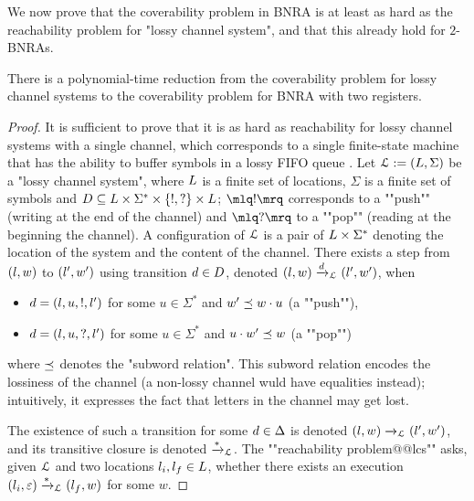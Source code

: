 We now prove that the coverability problem in BNRA is at least as hard as the reachability problem for "lossy channel system", and that this already hold for $2$-BNRAs.  
\begin{proposition}
	\label{prop:reduction-LCS}
	There is a polynomial-time reduction from the coverability problem for lossy channel systems to the coverability problem for BNRA with two registers.
\end{proposition}

\ifproofs
\begin{proof}
It is sufficient to prove that it is as hard as reachability for lossy channel systems with a single channel, which corresponds to a single finite-state machine that has the ability to buffer symbols in a lossy FIFO queue \cite{Schnoebelen2002verifying}.
Let $\mathcal{L} := (L,\Sigma)$ be a "lossy channel system", where $L$ is a finite set of locations, $\Sigma$ is a finite set of symbols and $D \subseteq L \times \Sigma^* \times \{!, ?\} \times L$; $\quotemarks{!}$ corresponds to a ""push"" (writing at the end of the channel) and $\quotemarks{?}$ to a ""pop"" (reading at the beginning the channel). A configuration of $\mathcal{L}$ is a pair of $L \times \Sigma^*$ denoting the location of the system and the content of the channel. There exists a step from $(l,w)$ to $(l',w')$ using transition $d \in D$, denoted $(l,w) \xrightarrow{d}_{\mathcal{L}} (l',w')$, when
\begin{itemize}
\item $d = (l,u,!,l')$ for some $u \in \Sigma^*$ and $w' \preceq w \cdot u$ (a ""push""),
\item $d = (l,u,?,l')$ for some $u \in \Sigma^*$ and $u \cdot w' \preceq w$ (a ""pop"")
\end{itemize}
where $\preceq$ denotes the "subword relation".
This subword relation encodes the lossiness of the channel (a non-lossy channel wuld have equalities instead); intuitively, it expresses the fact that letters in the channel may get lost. 

The existence of such a transition for some $d \in \Delta$ is denoted $(l,w) \xrightarrow{}_{\mathcal{L}} (l',w')$, and its transitive closure is denoted $\xrightarrow{*}_{\mathcal{L}}$. The ""reachability problem@@lcs"" asks, given $\mathcal{L}$ and two locations $l_i, l_f \in L$, whether there exists an execution $(l_i,\varepsilon) \xrightarrow{*}_{\mathcal{L}} (l_f, w)$ for some $w$. 


\end{proof}
